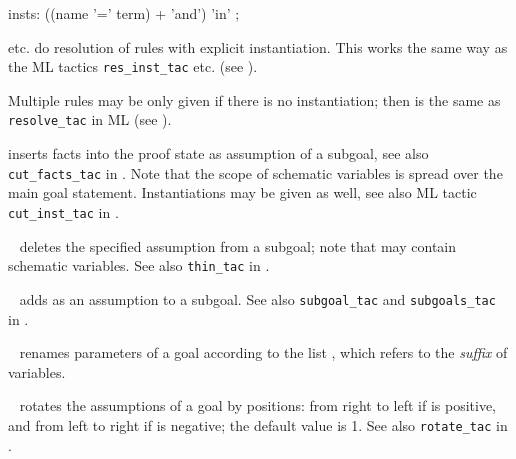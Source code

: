 \begin{isabellebody}
\begin{isamarkuptext}
\begin{rail}
    insts: ((name '=' term) + 'and') 'in'
    ;
  \end{rail}

\begin{descr}

  \item [\mbox{\isa{rule{\isacharunderscore}tac}} etc.] do resolution of rules with explicit
  instantiation.  This works the same way as the ML tactics \verb|res_inst_tac| etc. (see \cite[\S3]{isabelle-ref}).

  Multiple rules may be only given if there is no instantiation; then
  \mbox{} is the same as \verb|resolve_tac| in ML (see
  \cite[\S3]{isabelle-ref}).

  \item [\mbox{\isa{cut{\isacharunderscore}tac}}] inserts facts into the proof state as
  assumption of a subgoal, see also \verb|cut_facts_tac| in
  \cite[\S3]{isabelle-ref}.  Note that the scope of schematic
  variables is spread over the main goal statement.  Instantiations
  may be given as well, see also ML tactic \verb|cut_inst_tac| in
  \cite[\S3]{isabelle-ref}.

  \item [\mbox{\isa{thin{\isacharunderscore}tac}}~\isa{{\isasymphi}}] deletes the specified
  assumption from a subgoal; note that \isa{{\isasymphi}} may contain schematic
  variables.  See also \verb|thin_tac| in \cite[\S3]{isabelle-ref}.

  \item [\mbox{\isa{subgoal{\isacharunderscore}tac}}~\isa{{\isasymphi}}] adds \isa{{\isasymphi}} as an
  assumption to a subgoal.  See also \verb|subgoal_tac| and \verb|subgoals_tac| in \cite[\S3]{isabelle-ref}.

  \item [\mbox{\isa{rename{\isacharunderscore}tac}}~\isa{{\isachardoublequote}x\isactrlsub {\isadigit{1}}\ {\isasymdots}\ x\isactrlsub n{\isachardoublequote}}] renames
  parameters of a goal according to the list , which refers to the \emph{suffix} of variables.

  \item [\mbox{\isa{rotate{\isacharunderscore}tac}}~\isa{n}] rotates the assumptions of a
  goal by  positions: from right to left if  is
  positive, and from left to right if  is negative; the
  default value is 1.  See also \verb|rotate_tac| in
  \cite[\S3]{isabelle-ref}.


\end{descr}
\end{isamarkuptext}
\end{isabellebody}
